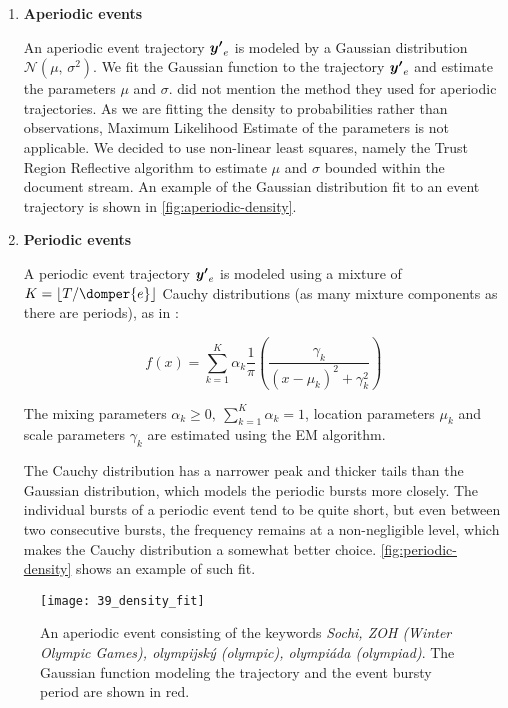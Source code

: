 \begin{enumerate}

\item \textbf{Aperiodic events}

An aperiodic event trajectory $\vect{\trajn}_{e}$ is modeled by a Gaussian distribution $\mathcal{N}(\mu,\,\sigma^{2})$. We fit the Gaussian function to the trajectory $\vect{\trajn}_{e}$ and estimate the parameters $\mu$ and $\sigma$. \cite{event-detection} did not mention the method they used for aperiodic trajectories. As we are fitting the density to probabilities rather than observations, Maximum Likelihood Estimate of the parameters is not applicable. We decided to use non-linear least squares, namely the Trust Region Reflective algorithm \citep{trust-region-reflective} to estimate $\mu$ and $\sigma$ bounded within the document stream. An example of the Gaussian distribution fit to an event trajectory is shown in \autoref{fig:aperiodic-density}.

\item \textbf{Periodic events}

A periodic event trajectory $\vect{\trajn}_{e}$ is modeled using a mixture of $K = \floor{\streamlen / \domper{e}}$ Cauchy distributions (as many mixture components as there are periods), as in \cite{health-events}:

\begin{equation*}
	f(x) = \sum_{k = 1}^{K}{\alpha_{k} \frac{1}{\pi} \left( \frac{\gamma_{k}}{\left( x - \mu_{k} \right)^{2} + \gamma_{k}^{2}} \right)}
\end{equation*}

The mixing parameters $\alpha_{k} \geq 0,\ \sum_{k = 1}^{K}{\alpha_{k}} = 1$, location parameters $\mu_{k}$ and scale parameters $\gamma_{k}$ are estimated using the EM algorithm.

The Cauchy distribution has a narrower peak and thicker tails than the Gaussian distribution, which models the periodic bursts more closely. The individual bursts of a periodic event tend to be quite short, but even between two consecutive bursts, the frequency remains at a non-negligible level, which makes the Cauchy distribution a somewhat better choice. \autoref{fig:periodic-density} shows an example of such fit.

\end{enumerate}

\begin{figure}
  \centering
  \texttt{[image: 39\_density\_fit]}  %
  \caption{An aperiodic event consisting of the keywords \textit{Sochi, ZOH (Winter Olympic Games), olympijský (olympic), olympiáda (olympiad)}. The Gaussian function modeling the trajectory and the event bursty period are shown in red.}
  \label{fig:aperiodic-density}
\end{figure}


